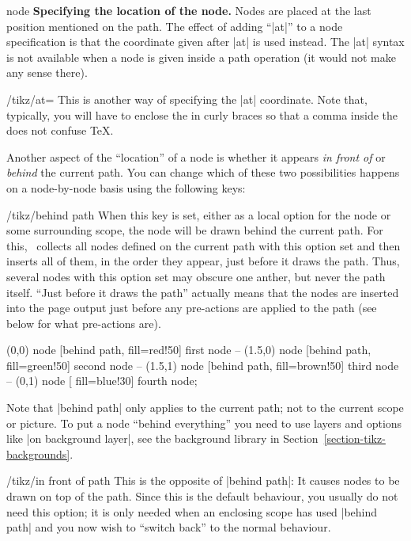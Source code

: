 \begin{pathoperation}{node}{%
    }
  \medskip
  \textbf{Specifying the location of the node.}
  Nodes are placed at the last position mentioned on the path. The
  effect of adding ``|at|'' to a node 
  specification is that the coordinate given after |at| is used
  instead. The |at| syntax is not available when a node is given
  inside a path operation (it would not make any sense there).

  \begin{key}{/tikz/at=}
    This is another way of specifying the |at| coordinate. Note that,
    typically, you will have to enclose the  in curly
    braces so that a comma inside the  does not
    confuse \TeX.
  \end{key}

  Another aspect of the ``location'' of a node is whether it appears
  \emph{in front of} or \emph{behind} the current path. You can change
  which of these two possibilities happens on a node-by-node basis
  using the following keys:
  \begin{key}{/tikz/behind path}
    When this key is set, either as a local option for the node or
    some surrounding scope, the node will be drawn behind the current
    path. For this, \tikzname\ collects all nodes defined on the
    current path with this option set and then inserts all of them, in
    the order they appear, just before it draws the path. Thus,
    several nodes with this option set may obscure one anther, but
    never the path itself. ``Just before it draws the path'' actually
    means that the nodes are inserted into the page output just before
    any pre-actions are applied to the path (see below for what
    pre-actions are).
\begin{codeexample}[]
\tikz \fill [fill=blue!50, draw=blue, very thick]
      (0,0)   node [behind path, fill=red!50]   {first node}
   -- (1.5,0) node [behind path, fill=green!50] {second node}
   -- (1.5,1) node [behind path, fill=brown!50] {third node}
   -- (0,1)   node [             fill=blue!30]  {fourth node};
\end{codeexample}
    
    Note that |behind path| only applies to the current path; not to
    the current scope or picture. To put a node ``behind everything''
    you need to use layers and options like |on background layer|, see
    the background library in Section~\ref{section-tikz-backgrounds}.
  \end{key}

  \begin{key}{/tikz/in front of path}
    This is the opposite of |behind path|: It causes nodes to be drawn
    on top of the path. Since this is the default behaviour, you
    usually do not need this option; it is only needed when an
    enclosing scope has used |behind path| and you now wish to
    ``switch back'' to the normal behaviour.
  \end{key}
  

\end{pathoperation}
